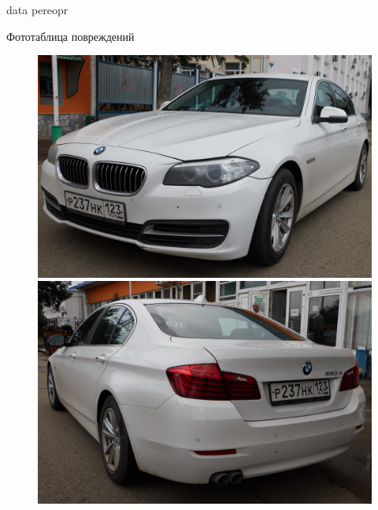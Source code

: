 \documentclass[a4paper,10pt]{report}
\begin{document}
 {data}
 {pereopr}


\Large{Фототаблица  повреждений }

%
%
%

\begin{figure}[ht]\centering
	
	\parbox[t]{0.49\textwidth}{\centering
		\includegraphics[angle=90,width=.49\textwidth]{1}
		\hfil \hfil%
		\caption{}\label{fig:metka−1}}
	\parbox[t]{0.49\textwidth}{\centering
		\includegraphics[angle=90,width=.49\textwidth]{2}
		\hfil \hfil%
		\caption{}\label{fig:metka−2}}
\end{figure}
\end{document}
